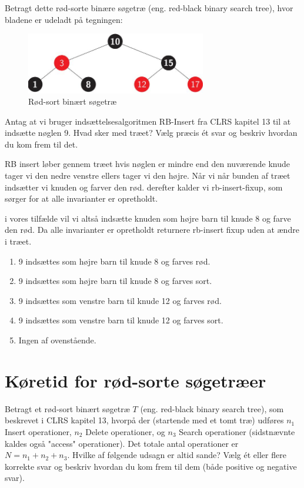 \documentclass{article}
\theoremstyle{definition}
\begin{document}
Betragt dette rød-sorte binære søgetræ (eng. red-black binary search tree), hvor bladene er udeladt på tegningen:

\begin{figure}[H]
    \centering
    \includegraphics[width=0.7\textwidth]{_page_2_Figure_0.jpeg}
    \caption{Rød-sort binært søgetræ}
\end{figure}

Antag at vi bruger indsættelsesalgoritmen RB-Insert fra CLRS kapitel 13 til at indsætte nøglen 9. Hvad sker med træet? Vælg præcis ét svar og beskriv hvordan du kom frem til det.

RB insert løber gennem træet hvis nøglen er mindre end den nuværende knude tager vi den nedre venstre ellers tager vi den højre. Når vi når bunden af træet indsætter vi knuden og farver den rød. derefter kalder vi rb-insert-fixup, som sørger for at alle invarianter er opretholdt.

i vores tilfælde vil vi altså indsætte knuden som højre barn til knude 8 og farve den rød. Da alle invarianter er opretholdt returnere rb-insert fixup uden at ændre i træet.

\begin{enumerate}
\item 9 indsættes som højre barn til knude 8 og farves rød. 
\item 9 indsættes som højre barn til knude 8 og farves sort. 
\item 9 indsættes som venstre barn til knude 12 og farves rød.
\item 9 indsættes som venstre barn til knude 12 og farves sort.
\item Ingen af ovenstående.
\end{enumerate}

\section{Køretid for rød-sorte søgetræer}

Betragt et rød-sort binært søgetræ $T$ (eng. red-black binary search tree), som beskrevet i CLRS kapitel 13, hvorpå der (startende med et tomt træ) udføres $n_1$ Insert operationer, $n_2$ Delete operationer, og $n_3$ Search operationer (sidstnævnte kaldes også "access" operationer). Det totale antal operationer er $N = n_1 + n_2 + n_3$. Hvilke af følgende udsagn er altid sande? Vælg ét eller flere korrekte svar og beskriv hvordan du kom frem til dem (både positive og negative svar).
\end{document}
